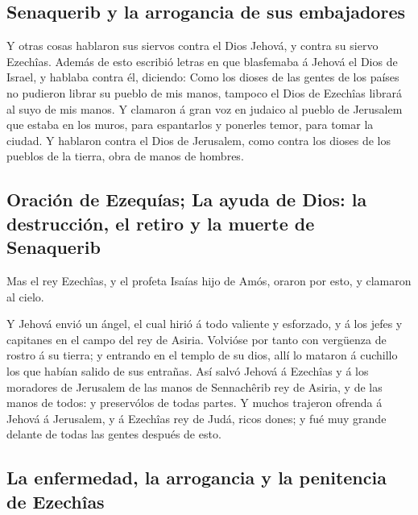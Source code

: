 \hypertarget{senaquerib-y-la-arrogancia-de-sus-embajadores}{%
\subsection{Senaquerib y la arrogancia de sus
embajadores}\label{senaquerib-y-la-arrogancia-de-sus-embajadores}}

 Y otras cosas hablaron sus siervos contra el Dios
Jehová, y contra su siervo Ezechîas.  Además de esto
escribió letras en que blasfemaba á Jehová el Dios de Israel, y hablaba
contra él, diciendo: Como los dioses de las gentes de los países no
pudieron librar su pueblo de mis manos, tampoco el Dios de Ezechîas
librará al suyo de mis manos.  Y clamaron á gran voz en
judaico al pueblo de Jerusalem que estaba en los muros, para espantarlos
y ponerles temor, para tomar la ciudad.  Y hablaron
contra el Dios de Jerusalem, como contra los dioses de los pueblos de la
tierra, obra de manos de hombres.

\hypertarget{oraciuxf3n-de-ezequuxedas-la-ayuda-de-dios-la-destrucciuxf3n-el-retiro-y-la-muerte-de-senaquerib}{%
\subsection{Oración de Ezequías; La ayuda de Dios: la destrucción, el
retiro y la muerte de
Senaquerib}\label{oraciuxf3n-de-ezequuxedas-la-ayuda-de-dios-la-destrucciuxf3n-el-retiro-y-la-muerte-de-senaquerib}}

 Mas el rey Ezechîas, y el profeta Isaías hijo de Amós,
oraron por esto, y clamaron al cielo.

 Y Jehová envió un ángel, el cual hirió á todo valiente y
esforzado, y á los jefes y capitanes en el campo del rey de Asiria.
Volvióse por tanto con vergüenza de rostro á su tierra; y entrando en el
templo de su dios, allí lo mataron á cuchillo los que habían salido de
sus entrañas.  Así salvó Jehová á Ezechîas y á los
moradores de Jerusalem de las manos de Sennachêrib rey de Asiria, y de
las manos de todos: y preservólos de todas partes.  Y
muchos trajeron ofrenda á Jehová á Jerusalem, y á Ezechîas rey de Judá,
ricos dones; y fué muy grande delante de todas las gentes después de
esto.

\hypertarget{la-enfermedad-la-arrogancia-y-la-penitencia-de-ezechuxeeas}{%
\subsection{La enfermedad, la arrogancia y la penitencia de
Ezechîas}\label{la-enfermedad-la-arrogancia-y-la-penitencia-de-ezechuxeeas}}

